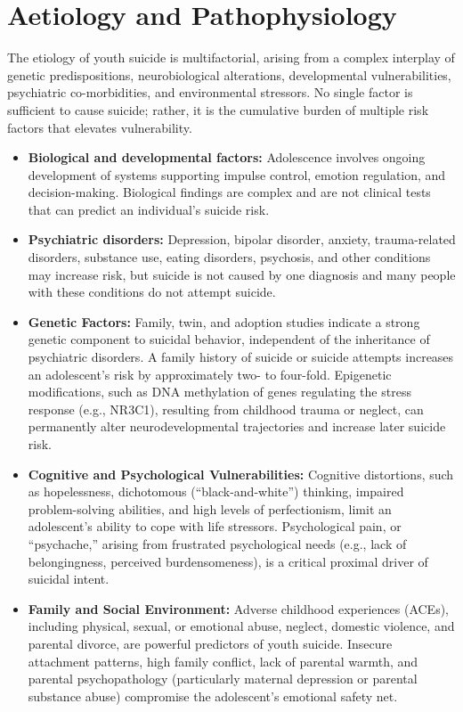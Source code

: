 \section*{Aetiology and Pathophysiology}
The etiology of youth suicide is multifactorial, arising from a complex interplay of genetic predispositions, neurobiological alterations, developmental vulnerabilities, psychiatric co-morbidities, and environmental stressors. No single factor is sufficient to cause suicide; rather, it is the cumulative burden of multiple risk factors that elevates vulnerability.
\begin{itemize}
    \item \textbf{Biological and developmental factors:} Adolescence involves ongoing development of systems supporting impulse control, emotion regulation, and decision-making. Biological findings are complex and are not clinical tests that can predict an individual's suicide risk.
    \item \textbf{Psychiatric disorders:} Depression, bipolar disorder, anxiety, trauma-related disorders, substance use, eating disorders, psychosis, and other conditions may increase risk, but suicide is not caused by one diagnosis and many people with these conditions do not attempt suicide.
    \item \textbf{Genetic Factors:} Family, twin, and adoption studies indicate a strong genetic component to suicidal behavior, independent of the inheritance of psychiatric disorders. A family history of suicide or suicide attempts increases an adolescent's risk by approximately two- to four-fold. Epigenetic modifications, such as DNA methylation of genes regulating the stress response (e.g., NR3C1), resulting from childhood trauma or neglect, can permanently alter neurodevelopmental trajectories and increase later suicide risk.
    \item \textbf{Cognitive and Psychological Vulnerabilities:} Cognitive distortions, such as hopelessness, dichotomous (``black-and-white'') thinking, impaired problem-solving abilities, and high levels of perfectionism, limit an adolescent's ability to cope with life stressors. Psychological pain, or ``psychache,'' arising from frustrated psychological needs (e.g., lack of belongingness, perceived burdensomeness), is a critical proximal driver of suicidal intent.
    \item \textbf{Family and Social Environment:} Adverse childhood experiences (ACEs), including physical, sexual, or emotional abuse, neglect, domestic violence, and parental divorce, are powerful predictors of youth suicide. Insecure attachment patterns, high family conflict, lack of parental warmth, and parental psychopathology (particularly maternal depression or parental substance abuse) compromise the adolescent's emotional safety net.

\end{itemize}
